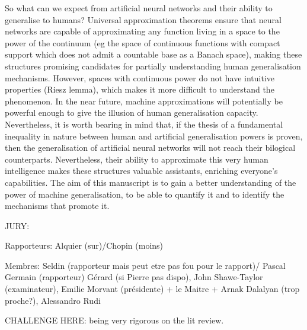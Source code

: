 So what can we expect from artificial neural networks and their ability to generalise to humans? Universal approximation theorems ensure that neural networks are capable of approximating any function living in a space to the power of the continuum (eg the space of continuous functions with compact support which does not admit a countable base as a Banach space), making these structures promising candidates for partially understanding human generalisation mechanisms.
 However, spaces with continuous power do not have intuitive properties (Riesz lemma), which makes it more difficult to understand the phenomenon. In the near future, machine approximations will potentially be powerful enough to give the illusion of human generalisation capacity. Nevertheless, it is worth bearing in mind that, if the thesis of a fundamental inequality in nature between human and artificial generalisation powers is proven, then the generalisation of artificial neural networks will not reach their bilogical counterparts. Nevertheless, their ability to approximate this very human intelligence makes these structures valuable assistants, enriching everyone's capabilities.  The aim of this manuscript is to gain a better understanding of the power of machine generalisation, to be able to quantify it and to identify the mechanisms that promote it.







JURY: 


Rapporteurs: Alquier (sur)/Chopin (moins)

Membres: Seldin (rapporteur mais peut etre pas fou pour le rapport)/ Pascal Germain (rapporteur) Gérard (si Pierre pas dispo), John Shawe-Taylor (examinateur), Emilie Morvant (présidente) + le Maitre + Arnak Dalalyan (trop proche?), Alessandro Rudi
 


CHALLENGE HERE: being very rigorous on the lit review.
\newpage